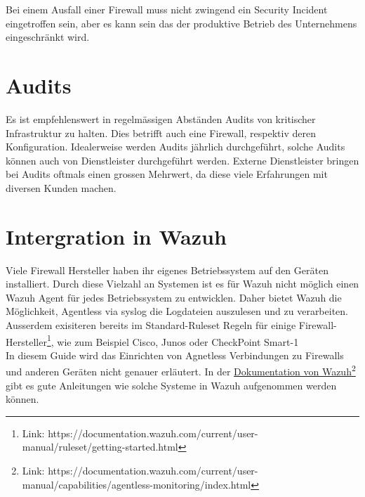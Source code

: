 Bei einem Ausfall einer Firewall muss nicht zwingend ein Security Incident eingetroffen sein, aber es kann sein das der produktive Betrieb des Unternehmens eingeschränkt wird.


\section{Audits}
Es ist empfehlenswert in regelmässigen Abständen Audits von kritischer Infrastruktur zu halten.
Dies betrifft auch eine Firewall, respektiv deren Konfiguration.
Idealerweise werden Audits jährlich durchgeführt, solche Audits können auch von Dienstleister durchgeführt werden.
Externe Dienstleister bringen bei Audits oftmals einen grossen Mehrwert, da diese viele Erfahrungen mit diversen Kunden machen.

\section{Intergration in Wazuh}
Viele Firewall Hersteller haben ihr eigenes Betriebssystem auf den Geräten installiert.
Durch diese Vielzahl an Systemen ist es für Wazuh nicht möglich einen Wazuh Agent für jedes Betriebssystem zu entwicklen.
Daher bietet Wazuh die Möglichkeit, Agentless via syslog die Logdateien auszulesen und zu verarbeiten.\\

Ausserdem exisiteren bereits im Standard-Ruleset Regeln für einige Firewall-Hersteller\footnote{Link: https://documentation.wazuh.com/current/user-manual/ruleset/getting-started.html}, wie zum Beispiel Cisco, Junos oder CheckPoint Smart-1\\

In diesem Guide wird das Einrichten von Agnetless Verbindungen zu Firewalls und anderen Geräten nicht genauer erläutert.
In der \href{https://documentation.wazuh.com/current/user-manual/capabilities/agentless-monitoring/index.html}{Dokumentation von Wazuh}\footnote{Link: https://documentation.wazuh.com/current/user-manual/capabilities/agentless-monitoring/index.html} gibt es gute Anleitungen wie solche Systeme in Wazuh aufgenommen werden können.